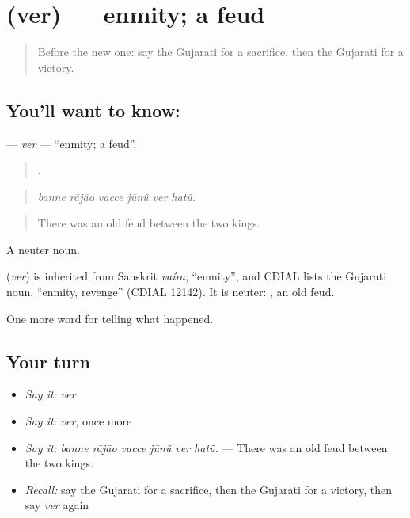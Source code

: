 \section[\texorpdfstring{\gu{વેર} (ver)}{વેર (ver)}]{ (ver) — enmity; a feud}

\label{lesson:GU-C323-ver}



\begin{quote}
Before the new one: say the Gujarati for a sacrifice, then the Gujarati for a victory.
\end{quote}

\subsection*{You'll want to know: }
\textbf{} — \emph{ver} — \textquotedblleft{}enmity; a feud\textquotedblright{}.

\begin{quote}
     .
\end{quote}

\begin{quote}
\emph{banne rājāo vacce jūnũ ver hatũ.}
\end{quote}

\begin{quote}
There was an old feud between the two kings.
\end{quote}

A neuter noun.

\begin{cousinweb}
\textbf{} (\emph{ver}) is inherited from Sanskrit \emph{vaíra}, \textquotedblleft{}enmity\textquotedblright{}, and CDIAL lists the Gujarati noun, \textquotedblleft{}enmity, revenge\textquotedblright{} (CDIAL 12142). It is neuter: \textbf{ }, an old feud.
\end{cousinweb}

\begin{grammarlens}[title={What you've built}]
One more word for telling what happened.
\end{grammarlens}

\subsection*{Your turn}
\begin{itemize}
\raggedright
  \item \emph{Say it:} \emph{ver}
  \item \emph{Say it:} \emph{ver}, once more
  \item \emph{Say it:} \emph{banne rājāo vacce jūnũ ver hatũ.} — There was an old feud between the two kings.
  \item \emph{Recall:} say the Gujarati for a sacrifice, then the Gujarati for a victory, then say \emph{ver} again
\end{itemize}

